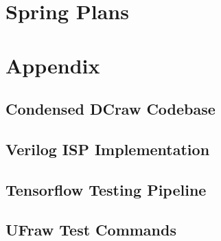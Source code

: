 \documentclass{report}
\begin{document}
\chapter{Spring Plans}

\chapter{Appendix}

\section{Condensed DCraw Codebase}

\section{Verilog ISP Implementation}

\section{Tensorflow Testing Pipeline} \label{pipelinecode}

\section{UFraw Test Commands} \label{ufrawcommands}
\end{document}
